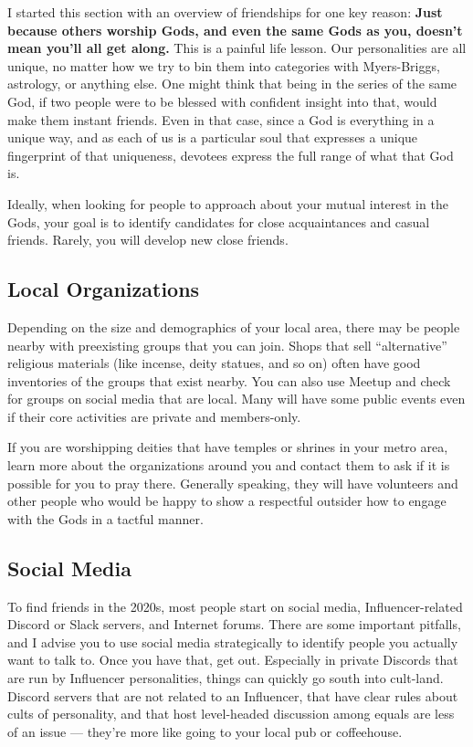 \documentclass[
]{book}
\begin{document}
I started this section with an overview of friendships for one key reason: \textbf{Just because others worship Gods, and even the same Gods as you, doesn't mean you'll all get along.} This is a painful life lesson. Our personalities are all unique, no matter how we try to bin them into categories with Myers-Briggs, astrology, or anything else. One might think that being in the series of the same God, if two people were to be blessed with confident insight into that, would make them instant friends. Even in that case, since a God is everything in a unique way, and as each of us is a particular soul that expresses a unique fingerprint of that uniqueness, devotees express the full range of what that God is.

Ideally, when looking for people to approach about your mutual interest in the Gods, your goal is to identify candidates for close acquaintances and casual friends. Rarely, you will develop new close friends.

\hypertarget{local-organizations}{%
\subsection{Local Organizations}\label{local-organizations}}

Depending on the size and demographics of your local area, there may be people nearby with preexisting groups that you can join. Shops that sell ``alternative'' religious materials (like incense, deity statues, and so on) often have good inventories of the groups that exist nearby. You can also use Meetup and check for groups on social media that are local. Many will have some public events even if their core activities are private and members-only.

If you are worshipping deities that have temples or shrines in your metro area, learn more about the organizations around you and contact them to ask if it is possible for you to pray there. Generally speaking, they will have volunteers and other people who would be happy to show a respectful outsider how to engage with the Gods in a tactful manner.

\hypertarget{social-media}{%
\subsection{Social Media}\label{social-media}}

To find friends in the 2020s, most people start on social media, Influencer-related Discord or Slack servers, and Internet forums. There are some important pitfalls, and I advise you to use social media strategically to identify people you actually want to talk to. Once you have that, get out. Especially in private Discords that are run by Influencer personalities, things can quickly go south into cult-land. Discord servers that are not related to an Influencer, that have clear rules about cults of personality, and that host level-headed discussion among equals are less of an issue --- they're more like going to your local pub or coffeehouse.
\end{document}
